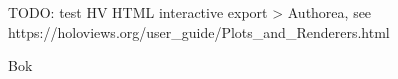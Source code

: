 TODO: test HV HTML interactive export > Authorea, see https://holoviews.org/user_guide/Plots_and_Renderers.html

Bok